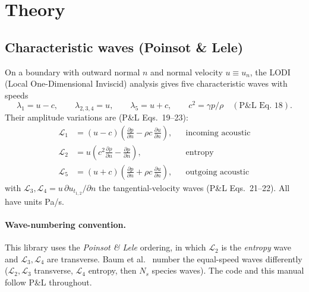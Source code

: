 \documentclass[11pt,a4paper]{article}
\newcommand{\dn}[1]{\frac{\partial #1}{\partial n}}
\newcommand{\Lc}{\mathcal{L}}
\begin{document}
\section{Theory}

\subsection{Characteristic waves (Poinsot \& Lele)}
On a boundary with outward normal $n$ and normal velocity $u\equiv u_n$, the
LODI (Local One-Dimensional Inviscid) analysis gives five characteristic waves
with speeds
\[
  \lambda_1=u-c,\qquad \lambda_{2,3,4}=u,\qquad \lambda_5=u+c,
  \qquad c^2=\gamma p/\rho \quad(\text{P\&L Eq.~18}).
\]
Their amplitude variations are (P\&L Eqs.~19--23):
\begin{align}
  \Lc_1 &= (u-c)\!\left(\dn{p}-\rho c\,\dn{u}\right), &&\text{incoming acoustic}\label{eq:L1}\\
  \Lc_2 &= u\!\left(c^2\dn{\rho}-\dn{p}\right),       &&\text{entropy}\label{eq:L2}\\
  \Lc_5 &= (u+c)\!\left(\dn{p}+\rho c\,\dn{u}\right), &&\text{outgoing acoustic}\label{eq:L5}
\end{align}
with $\Lc_3,\Lc_4=u\,\partial u_{t_{1,2}}/\partial n$ the tangential-velocity
waves (P\&L Eqs.~21--22). All have units Pa/s.

\paragraph{Wave-numbering convention.} This library uses the \emph{Poinsot \&
Lele} ordering, in which $\Lc_2$ is the \emph{entropy} wave and
$\Lc_3,\Lc_4$ are transverse. Baum et al.~\cite{BPT94} number the equal-speed
waves differently ($\Lc_2,\Lc_3$ transverse, $\Lc_4$ entropy, then $N_s$
species waves). The code and this manual follow P\&L throughout.
\end{document}
